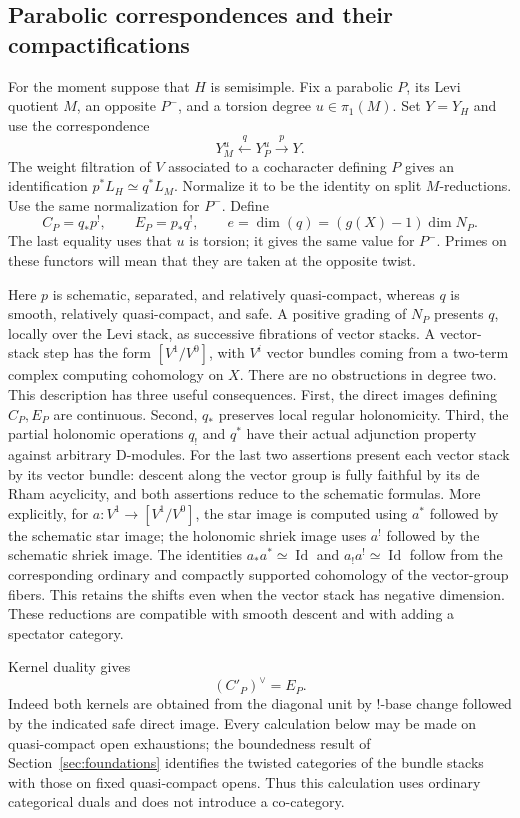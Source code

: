 \subsection{Parabolic correspondences and their compactifications}

For the moment suppose that $H$ is semisimple.  Fix a parabolic $P$, its Levi
quotient $M$, an opposite $P^-$, and a torsion degree $u\in\pi_1(M)$.  Set
$Y=Y_H$ and use the correspondence
\[
 Y_M^u\xleftarrow{\ q\ }Y_P^u\xrightarrow{\ p\ }Y.
\]
The weight filtration of $V$ associated to a cocharacter defining $P$ gives
an identification $p^*L_H\simeq q^*L_M$.  Normalize it to be the identity on
split $M$-reductions.  Use the same normalization for $P^-$.  Define
\[
 C_P=q_*p^!,\qquad E_P=p_*q^!,\qquad
 e=\dim(q)=(g(X)-1)\dim N_P.
\]
The last equality uses that $u$ is torsion; it gives the same value for $P^-$.
Primes on these functors will mean that they are taken at the opposite twist.

Here $p$ is schematic, separated, and relatively quasi-compact, whereas $q$
is smooth, relatively quasi-compact, and safe.  A positive grading of $N_P$
presents $q$, locally over the Levi stack, as successive fibrations of vector
stacks.  A vector-stack step has the form $[V^1/V^0]$, with $V^i$ vector bundles
coming from a two-term complex computing cohomology on $X$.  There are no
obstructions in degree two.  This description has three useful consequences.
First, the direct images defining $C_P,E_P$ are continuous.  Second, $q_*$
preserves local regular holonomicity.  Third, the partial holonomic operations
$q_!$ and $q^*$ have their actual adjunction property against arbitrary
D-modules.  For the last two assertions present each vector stack by its
vector bundle: descent along the vector group is fully faithful by its de
Rham acyclicity, and both assertions reduce to the schematic formulas.
More explicitly, for $a:V^1\to[V^1/V^0]$, the star image is
computed using $a^*$ followed by the schematic star image; the holonomic
shriek image uses $a^!$ followed by the schematic shriek image.  The
identities $a_*a^*\simeq\operatorname{Id}$ and
$a_!a^!\simeq\operatorname{Id}$ follow from the corresponding ordinary
and compactly supported cohomology of the vector-group fibers.  This
retains the shifts even when the vector stack has negative dimension.
These reductions are compatible with smooth descent and with adding a
spectator category.

Kernel duality gives
\[
 (C'_P)^\vee=E_P.
\]
Indeed both kernels are obtained from the diagonal unit by !-base change
followed by the indicated safe direct image.  Every calculation below may
be made on quasi-compact open exhaustions; the boundedness result of
Section~\ref{sec:foundations} identifies the twisted categories of the bundle
stacks with those on fixed quasi-compact opens.  Thus this calculation uses
ordinary categorical duals and does not introduce a co-category.

